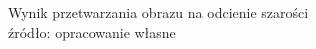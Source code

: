 \documentclass[eng,oneside]{mgr}
\begin{document}
\begin{figure}[hbtp]
{}
\quad
{}
\renewcommand\figurename{Przykład}
\caption{Wynik przetwarzania obrazu na odcienie szarości\\ 
źródło: opracowanie własne}
\end{figure}
\end{document}
